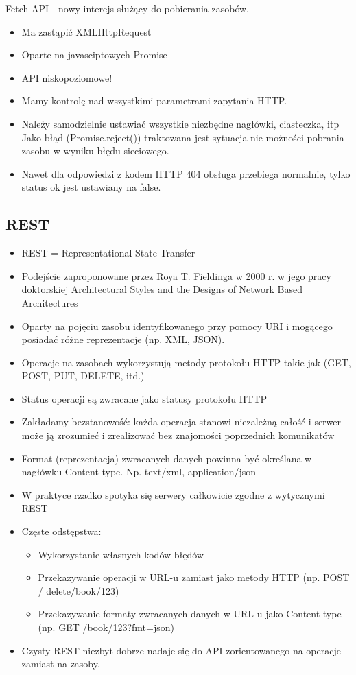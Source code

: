 \documentclass[../main.tex]{subfiles}
\begin{document}
    Fetch API - nowy interejs służący do pobierania zasobów.
    \begin{itemize}
        \item Ma zastąpić XMLHttpRequest
        \item Oparte na javasciptowych Promise
        \item API niskopoziomowe!
        \item Mamy kontrolę nad wszystkimi parametrami zapytania HTTP.
        \item Należy samodzielnie ustawiać wszystkie niezbędne nagłówki, ciasteczka, itp
        Jako błąd (Promise.reject()) traktowana jest sytuacja nie możności pobrania
        zasobu w wyniku błędu sieciowego.
        \item Nawet dla odpowiedzi z kodem HTTP 404 obsługa przebiega normalnie, tylko
        status ok jest ustawiany na false.
    \end{itemize}


    \subsection{REST}
    \begin{itemize}
        \item REST = Representational State Transfer
        \item Podejście zaproponowane przez Roya T. Fieldinga w 2000 r. w jego pracy doktorskiej Architectural Styles and the Designs of Network Based Architectures
        \item Oparty na pojęciu zasobu identyfikowanego przy pomocy URI i mogącego posiadać różne reprezentacje (np. XML, JSON).
        \item Operacje na zasobach wykorzystują metody protokołu HTTP takie jak (GET, POST, PUT, DELETE, itd.)
        \item Status operacji są zwracane jako statusy protokołu HTTP
        \item Zakładamy bezstanowość: każda operacja stanowi niezależną całość i serwer może ją zrozumieć i zrealizować bez znajomości poprzednich komunikatów
        \item Format (reprezentacja) zwracanych danych powinna być określana w nagłówku Content-type. Np. text/xml, application/json
        \item W praktyce rzadko spotyka się serwery całkowicie zgodne z wytycznymi REST
        \item Częste odstępstwa:
        \begin{itemize}
            \item Wykorzystanie własnych kodów błędów
            \item Przekazywanie operacji w URL-u zamiast jako metody HTTP (np. POST / delete/book/123)
            \item Przekazywanie formaty zwracanych danych w URL-u jako Content-type (np. GET /book/123?fmt=json)
        \end{itemize}
        \item Czysty REST niezbyt dobrze nadaje się do API zorientowanego na operacje
        zamiast na zasoby.
    \end{itemize}
\end{document}
